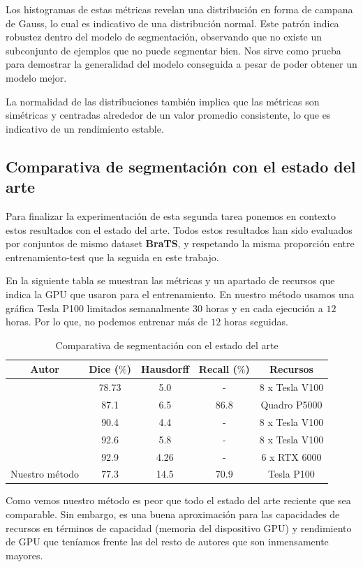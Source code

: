 Los histogramas de estas métricas revelan una distribución en forma de campana de Gauss, lo cual es indicativo de una distribución normal. Este patrón indica robustez dentro del modelo de segmentación, observando que no existe un subconjunto de ejemplos que no puede segmentar bien. Nos sirve como prueba para demostrar la generalidad del modelo conseguida a pesar de poder obtener un modelo mejor.

La normalidad de las distribuciones también implica que las métricas son simétricas y centradas alrededor de un valor promedio consistente, lo que es indicativo de un rendimiento estable.

\subsection{Comparativa de segmentación con el estado del arte}

Para finalizar la experimentación de esta segunda tarea ponemos en contexto estos resultados con el estado del arte. Todos estos resultados han sido evaluados por conjuntos de mismo dataset \textbf{BraTS}, y respetando la misma proporción entre entrenamiento-test que la seguida en este trabajo.

En la siguiente tabla se muestran las métricas y un apartado de recursos que indica la GPU que usaron para el entrenamiento. En nuestro método usamos una gráfica Tesla P100 limitados semanalmente $30$ horas y en cada ejecución a $12$ horas. Por lo que, no podemos entrenar más de $12$ horas seguidas.

\begin{table}[H]
	\centering
	\begin{tabular}{|ccccc|}
		\toprule
		Autor & Dice ($\%$) & Hausdorff & Recall ($\%$) & Recursos \\
		\midrule
		\cite{chen2021transunet} & 78.73 & 5.0 & - & 8 x Tesla V100 \\
		\cite{zhou2021latent} & 87.1 & 6.5 & 86.8 & Quadro P5000 \\
		\cite{myronenko20193d} & 90.4 & 4.4 & - & 8 x Tesla V100\\   
		\cite{hatamizadeh2021swin} & 92.6 & 5.8 & - & 8 x Tesla V100 \\ 
		\cite{ferreira2024we} & 92.9 & 4.26 & - & 6 x RTX 6000\\
		Nuestro método & 77.3 & 14.5 & 70.9 & Tesla P100 \\ 
		\bottomrule
	\end{tabular}
	\caption{Comparativa de segmentación con el estado del arte}
	\label{tabla:resultados13}
\end{table}

Como vemos nuestro método es peor que todo el estado del arte reciente que sea comparable. Sin embargo, es una buena aproximación para las capacidades de recursos en términos de capacidad (memoria del dispositivo GPU) y rendimiento de GPU que teníamos frente las del resto de autores que son inmensamente mayores. 
